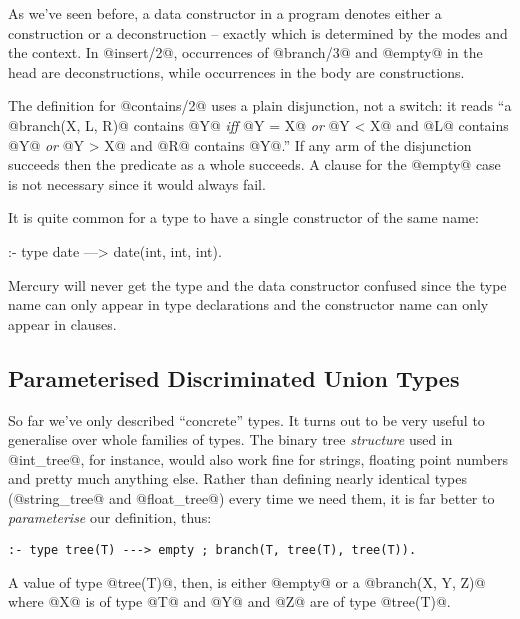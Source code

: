 As we've seen before, a data constructor in a program denotes either a
construction or a deconstruction -- exactly which is determined by the
modes and the context.  In @insert/2@, occurrences of @branch/3@ and
@empty@ in the head are deconstructions, while occurrences in the body are
constructions.

The definition for @contains/2@ uses a plain disjunction, not a switch:
it reads ``a @branch(X, L, R)@ contains @Y@ \emph{iff} @Y = X@
\emph{or} @Y < X@ and @L@ contains @Y@ \emph{or} @Y > X@ and @R@
contains @Y@.''
If any arm of the disjunction succeeds then the predicate as a
whole succeeds.  A clause for the @empty@ case is not necessary since it
would always fail.

It is quite common for a type to have a single constructor of the same
name:
\begin{myverbatim}
:- type date ---> date(int, int, int).  %
\end{myverbatim}
Mercury will never get the type and the data constructor confused since
the type name can only appear in type declarations and the constructor
name can only appear in clauses.

\subsection{Parameterised Discriminated Union Types}

So far we've only described ``concrete'' types.  It turns out to be very
useful to generalise over whole families of types.  The binary
tree \emph{structure} used in @int_tree@, for instance, would also work
fine for strings, floating
point numbers and pretty much anything else.  Rather than defining
nearly identical types (\eg @string_tree@ and @float_tree@) every time
we need them, it is far better to \emph{parameterise} our definition, thus:
\begin{verbatim}
:- type tree(T) ---> empty ; branch(T, tree(T), tree(T)).
\end{verbatim}
A value of type @tree(T)@, then, is either @empty@ or a @branch(X, Y, Z)@
where @X@ is of type @T@ and @Y@ and @Z@ are of type @tree(T)@.

